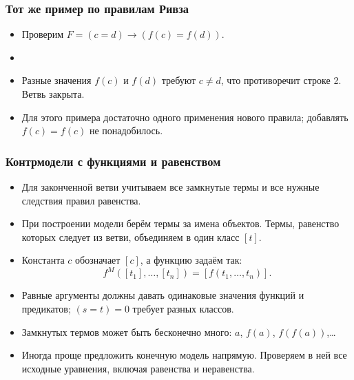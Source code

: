 \documentclass[10pt]{beamer}
\begin{document}
\begin{frame}
\begin{framefont}{\small}
\frametitle{Тот же пример по правилам Ривза}
\begin{itemize}
    \item Проверим $F=(c=d)\to(f(c)=f(d))$.
    \item[]
    \item<2-> Разные значения $f(c)$ и $f(d)$ требуют $c\ne d$, что противоречит строке 2. Ветвь закрыта.
    \item<2-> Для этого примера достаточно одного применения нового правила; добавлять $f(c)=f(c)$ не понадобилось.
\end{itemize}
\end{framefont}
\end{frame}

\begin{frame}
\begin{framefont}{\small}
\frametitle{Контрмодели с функциями и равенством}
\begin{itemize}
    \item Для законченной ветви учитываем все замкнутые термы и все нужные следствия правил равенства.
    \item При построении модели берём термы за имена объектов. Термы, равенство которых следует из ветви, объединяем в один класс $[t]$.
    \pause
    \item Константа $c$ обозначает $[c]$, а функцию задаём так:
    \[ f^M([t_1],\ldots,[t_n])=[f(t_1,\ldots,t_n)]. \]
    \item Равные аргументы должны давать одинаковые значения функций и предикатов; $(s=t)=0$ требует разных классов.
    \pause
    \item Замкнутых термов может быть бесконечно много: $a$, $f(a)$, $f(f(a))$,\ldots
    \item Иногда проще предложить конечную модель напрямую. Проверяем в ней все исходные уравнения, включая равенства и неравенства.
\end{itemize}
\end{framefont}
\end{frame}
\end{document}
